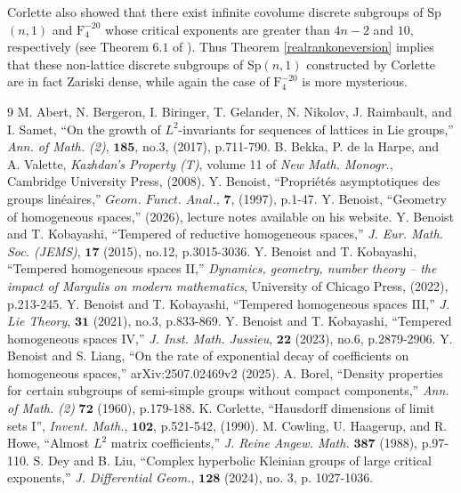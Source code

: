 \documentclass[psamsfonts]{amsart}
\theoremstyle{definition}
\theoremstyle{remark}
\numberwithin{equation}{section}
\begin{document}
Corlette also showed that there exist infinite covolume discrete subgroups of Sp$(n,1)$ and $\mathrm{F}_{4}^{-20}$ whose critical exponents are greater than $4n-2$ and $10$, respectively (see Theorem $6.1$ of \cite{Cor}). Thus Theorem \ref{realrankoneversion} implies that these non-lattice discrete subgroups of Sp$(n,1)$ constructed by Corlette are in fact Zariski dense, while again the case of $\mathrm{F}_{4}^{-20}$ is more mysterious.


\begin{thebibliography}{9}
M. Abert, N. Bergeron, I. Biringer, T. Gelander, N. Nikolov, J. Raimbault, and I. Samet, ``On the growth of $L^{2}$-invariants for sequences of lattices in Lie groups,'' \emph{Ann. of Math. (2)}, $\textbf{185}$, no.3, (2017), p.711-790.
B. Bekka, P. de la Harpe, and A. Valette, \emph{Kazhdan's Property (T)}, volume 11 of \emph{New Math. Monogr.}, Cambridge University Press, (2008).
Y. Benoist, ``Propri\'et\'es asymptotiques des groups lin\'eaires,'' $\textit{Geom. Funct. Anal.}$, $\textbf{7}$, (1997), p.1-47.
Y. Benoist, ``Geometry of homogeneous spaces,'' (2026), lecture notes available on his website.
Y. Benoist and T. Kobayashi, ``Tempered of reductive homogeneous spaces,'' \emph{J. Eur. Math. Soc. (JEMS)}, $\textbf{17}$ (2015), no.12, p.3015-3036.
Y. Benoist and T. Kobayashi, ``Tempered homogeneous spaces II,'' \emph{Dynamics, geometry, number theory -- the impact of Margulis on modern mathematics}, University of Chicago Press, (2022), p.213-245.
Y. Benoist and T. Kobayashi, ``Tempered homogeneous spaces III,'' \emph{J. Lie Theory}, $\textbf{31}$ (2021), no.3, p.833-869.
Y. Benoist and T. Kobayashi, ``Tempered homogeneous spaces IV,'' \emph{J. Inst. Math. Jussieu}, $\textbf{22}$ (2023), no.6, p.2879-2906.
Y. Benoist and S. Liang, ``On the rate of exponential decay of coefficients on homogeneous spaces,'' arXiv:2507.02469v2 (2025).
A. Borel, ``Density properties for certain subgroups of semi-simple groups without compact components,'' \emph{Ann. of Math. (2)} $\textbf{72}$ (1960), p.179-188.
K. Corlette, ``Hausdorff dimensions of limit sets I'', \emph{Invent. Math.}, $\textbf{102}$, p.521-542, (1990).
M. Cowling, U. Haagerup, and R. Howe, ``Almost $L^2$ matrix coefficients,'' \emph{J. Reine Angew. Math.} $\textbf{387}$ (1988), p.97-110.
S. Dey and B. Liu, ``Complex hyperbolic Kleinian groups of large critical exponents,'' \emph{J. Differential Geom.}, $\textbf{128}$ (2024), no. 3, p. 1027-1036.

\end{thebibliography}
\end{document}
